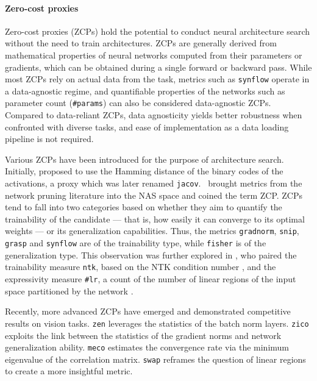 \documentclass[10pt]{article} %
\begin{document}
\paragraph{Zero-cost proxies} Zero-cost proxies (ZCPs) \citep{mellor2021neural, abdelfattah2021zero} hold the potential to conduct neural architecture search without the need to train architectures. ZCPs are generally derived from mathematical properties of neural networks computed from their parameters or gradients, which can be obtained during a single forward or backward pass. While most ZCPs rely on actual data from the task, metrics such as \texttt{synflow} operate in a data-agnostic regime, and quantifiable properties of the networks such as parameter count (\texttt{\#params}) can also be considered data-agnostic ZCPs. Compared to data-reliant ZCPs, data agnosticity yields better robustness when confronted with diverse tasks, and ease of implementation as a data loading pipeline is not required.

Various ZCPs have been introduced for the purpose of architecture search. Initially, \citet{mellor2021neural} proposed to use the Hamming distance of the binary codes of the activations, a proxy which was later renamed \texttt{jacov}.~\citet{abdelfattah2021zero} brought metrics from the network pruning literature into the NAS space and coined the term ZCP. ZCPs tend to fall into two categories based on whether they aim to quantify the trainability of the candidate --- that is, how easily it can converge to its optimal weights --- or its generalization capabilities. Thus, the metrics \texttt{gradnorm}, \texttt{snip}, \texttt{grasp} and \texttt{synflow} are of the trainability type, while \texttt{fisher} is of the generalization type. This observation was further explored in \citet{chen2021neural}, who paired the trainability measure \texttt{ntk}, based on the NTK condition number \citep{xiao2019disentangling}, and the expressivity measure \texttt{\#lr}, a count of the number of linear regions of the input space partitioned by the network \citep{raghu2017expressive}.

Recently, more advanced ZCPs have emerged and demonstrated competitive results on vision tasks. \texttt{zen} \citep{lin2021zen} leverages the statistics of the batch norm layers. \texttt{zico} \citep{li2023zico} exploits the link between the statistics of the gradient norms and network generalization ability. \texttt{meco} \citep{jiang2023meco} estimates the convergence rate via the minimum eigenvalue of the correlation matrix. \texttt{swap} \citep{peng2024swap} reframes the question of linear regions to create a more insightful metric.
\end{document}
